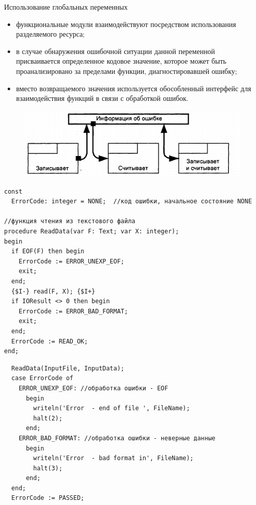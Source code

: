 \documentclass[xcolor=table]{beamer}
\begin{document}
\begin{frame}{Использование глобальных переменных}
	\begin{itemize}
		\item функциональные модули взаимодействуют посредством использования разделяемого ресурса;
		\item в случае обнаружения ошибочной ситуации данной переменной присваивается определенное кодовое значение, которое может быть проанализировано за пределами функции, диагностировавшей ошибку;
		\item вместо возвращаемого значения используется обособленный интерфейс для взаимодействия функций в связи с обработкой ошибок.
	\end{itemize}
	\begin{figure}[h]
		\centering
		\includegraphics[scale=0.5]{images/lec08-pic02.png}
	\end{figure}
\end{frame}

\begin{frame}[fragile]
	\begin{verbatim}
const
  ErrorCode: integer = NONE;  //код ошибки, начальное состояние NONE

//функция чтения из текстового файла
procedure ReadData(var F: Text; var X: integer);
begin
  if EOF(F) then begin
    ErrorCode := ERROR_UNEXP_EOF;
    exit;
  end;
  {$I-} read(F, X); {$I+}
  if IOResult <> 0 then begin
    ErrorCode := ERROR_BAD_FORMAT;
    exit;
  end;
  ErrorCode := READ_OK;
end;
	\end{verbatim}
\end{frame}

\begin{frame}[fragile]
	\begin{verbatim}
  ReadData(InputFile, InputData);
  case ErrorCode of
    ERROR_UNEXP_EOF: //обработка ошибки - EOF
      begin
        writeln('Error  - end of file ', FileName);
        halt(2);
      end;
    ERROR_BAD_FORMAT: //обработка ошибки - неверные данные
      begin
        writeln('Error  - bad format in', FileName);
        halt(3);
      end;
  end;
  ErrorCode := PASSED; 
	\end{verbatim}
\end{frame}
\end{document}
